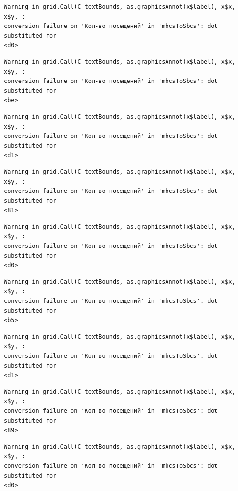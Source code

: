 \documentclass[
  letterpaper,
  DIV=11,
  numbers=noendperiod]{scrartcl}
\begin{document}
\begin{verbatim}
Warning in grid.Call(C_textBounds, as.graphicsAnnot(x$label), x$x, x$y, :
conversion failure on 'Кол-во посещений' in 'mbcsToSbcs': dot substituted for
<d0>
\end{verbatim}

\begin{verbatim}
Warning in grid.Call(C_textBounds, as.graphicsAnnot(x$label), x$x, x$y, :
conversion failure on 'Кол-во посещений' in 'mbcsToSbcs': dot substituted for
<be>
\end{verbatim}

\begin{verbatim}
Warning in grid.Call(C_textBounds, as.graphicsAnnot(x$label), x$x, x$y, :
conversion failure on 'Кол-во посещений' in 'mbcsToSbcs': dot substituted for
<d1>
\end{verbatim}

\begin{verbatim}
Warning in grid.Call(C_textBounds, as.graphicsAnnot(x$label), x$x, x$y, :
conversion failure on 'Кол-во посещений' in 'mbcsToSbcs': dot substituted for
<81>
\end{verbatim}

\begin{verbatim}
Warning in grid.Call(C_textBounds, as.graphicsAnnot(x$label), x$x, x$y, :
conversion failure on 'Кол-во посещений' in 'mbcsToSbcs': dot substituted for
<d0>
\end{verbatim}

\begin{verbatim}
Warning in grid.Call(C_textBounds, as.graphicsAnnot(x$label), x$x, x$y, :
conversion failure on 'Кол-во посещений' in 'mbcsToSbcs': dot substituted for
<b5>
\end{verbatim}

\begin{verbatim}
Warning in grid.Call(C_textBounds, as.graphicsAnnot(x$label), x$x, x$y, :
conversion failure on 'Кол-во посещений' in 'mbcsToSbcs': dot substituted for
<d1>
\end{verbatim}

\begin{verbatim}
Warning in grid.Call(C_textBounds, as.graphicsAnnot(x$label), x$x, x$y, :
conversion failure on 'Кол-во посещений' in 'mbcsToSbcs': dot substituted for
<89>
\end{verbatim}

\begin{verbatim}
Warning in grid.Call(C_textBounds, as.graphicsAnnot(x$label), x$x, x$y, :
conversion failure on 'Кол-во посещений' in 'mbcsToSbcs': dot substituted for
<d0>
\end{verbatim}
\end{document}
